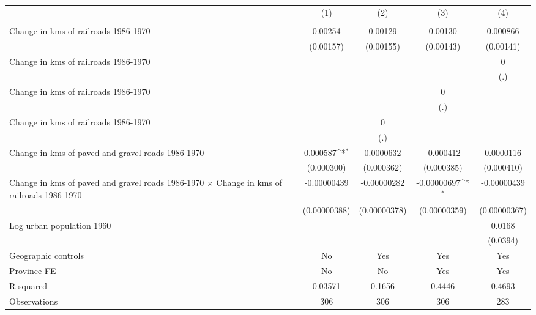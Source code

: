 {
\def\sym#1{\ifmmode^{#1}\else\(^{#1}\)\fi}
\begin{tabular}{l*{4}{c}}
\hline\hline
                &\multicolumn{1}{c}{(1)}&\multicolumn{1}{c}{(2)}&\multicolumn{1}{c}{(3)}&\multicolumn{1}{c}{(4)}\\
                &\multicolumn{1}{c}{}&\multicolumn{1}{c}{}&\multicolumn{1}{c}{}&\multicolumn{1}{c}{}\\
\hline
Change in kms of railroads 1986-1970&  0.00254         &  0.00129         &  0.00130         & 0.000866         \\
                &(0.00157)         &(0.00155)         &(0.00143)         &(0.00141)         \\
[1em]
Change in kms of railroads 1986-1970&                  &                  &                  &        0         \\
                &                  &                  &                  &      (.)         \\
[1em]
Change in kms of railroads 1986-1970&                  &                  &        0         &                  \\
                &                  &                  &      (.)         &                  \\
[1em]
Change in kms of railroads 1986-1970&                  &        0         &                  &                  \\
                &                  &      (.)         &                  &                  \\
[1em]
Change in kms of paved and gravel roads 1986-1970& 0.000587\sym{*}  &0.0000632         &-0.000412         &0.0000116         \\
                &(0.000300)         &(0.000362)         &(0.000385)         &(0.000410)         \\
[1em]
Change in kms of paved and gravel roads 1986-1970 $\times$ Change in kms of railroads 1986-1970&-0.00000439         &-0.00000282         &-0.00000697\sym{*}  &-0.00000439         \\
                &(0.00000388)         &(0.00000378)         &(0.00000359)         &(0.00000367)         \\
[1em]
Log urban population 1960&                  &                  &                  &   0.0168         \\
                &                  &                  &                  & (0.0394)         \\
\hline
Geographic controls&       No         &      Yes         &      Yes         &      Yes         \\
Province FE     &       No         &       No         &      Yes         &      Yes         \\
R-squared       &  0.03571         &   0.1656         &   0.4446         &   0.4693         \\
Observations    &      306         &      306         &      306         &      283         \\
\hline\hline
\end{tabular}
}

